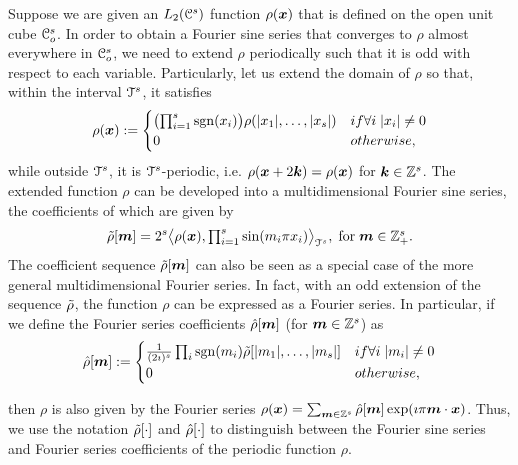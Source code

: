 Suppose we are given an $L_2(\mathcal{C}^s)$ function $\rho(\boldsymbol{x})$ that is defined on the open unit cube $\mathcal{C}_o^s$. 
In order to obtain a Fourier sine series that converges to $\rho$ almost everywhere in
$\mathcal{C}_o^s$, we need to extend $\rho$ periodically such that it is odd with respect to each variable. 
Particularly, let us extend the domain of $\rho$ so that, within the interval $\mathcal{T}^s$, it satisfies
{\small
\begin{equation}  
 \rho(\vect{x}) :=  
\begin{cases}
\bigl( \prod_{i=1}^s \sgn(x_i) \bigr)
\rho(|x_1|, \ldots, |x_s| ) &\mbox{if } \forall i \; |x_i| \ne 0 \\ 
0 &\mbox{otherwise},
\end{cases}
\label{eq:oddextension}
\end{equation}
}
while outside $\mathcal{T}^s$, it is $\mathcal{T}^s$-periodic, i.e. $\rho(\boldsymbol{x} + 2\boldsymbol{k}) = \rho(\boldsymbol{x})$ for $\boldsymbol{k} \in \mathbb{Z}^s$. 
The extended function $\rho$ can be developed into a multidimensional Fourier sine series, the coefficients of which are given by 
\begin{equation}
  \tilde{\rho}[\boldsymbol{m}] = 2^s \bigl \langle \rho(\boldsymbol{x}) , \textstyle{\prod_{i=1}^s}\sin(m_i\pi x_i) \bigr \rangle_{\mathcal{T}^s}, \; \text{for}\; \boldsymbol{m} \in \mathbb{Z}^s_+.
\end{equation}
The coefficient sequence $\tilde{\rho}[\boldsymbol{m}]$ can also be seen as a special case of the more general multidimensional Fourier series. 
In fact, with an odd extension of the sequence $\tilde{\rho}$, the function $\rho$ can be expressed as a Fourier series. 
In particular, if we define the Fourier series coefficients $\hat{\rho}[\boldsymbol{m}]$
(for $\boldsymbol{m} \in \mathbb{Z}^s$) as
{\small \begin{equation}
	\ft{\rho}[\vect{m}] := 
	\begin{cases}
	\frac{1}{(2\imath)^{s}} \prod_i \sgn(m_i)
	\st{\rho}[|m_1|,\ldots,|m_s|] &\mbox{if } \forall i \; |m_i| \ne 0 \\
	0 &\mbox{otherwise},
	\end{cases}
	\label{eq:oddFourierExtension}
\end{equation}}

then  $\rho$ is also given by the Fourier series
$
  \rho(\boldsymbol{x}) = \sum_{\boldsymbol{m} \in
    \mathbb{Z}^s} \hat{\rho}[\boldsymbol{m}] 
\exp(\imath \pi \boldsymbol{m} \cdot \boldsymbol{x})
$.
Thus, we use the notation $\tilde{\rho}[\cdot]$ and $\hat{\rho}[\cdot]$ to
distinguish between the Fourier sine series and Fourier series
coefficients of the periodic function $\rho$.

